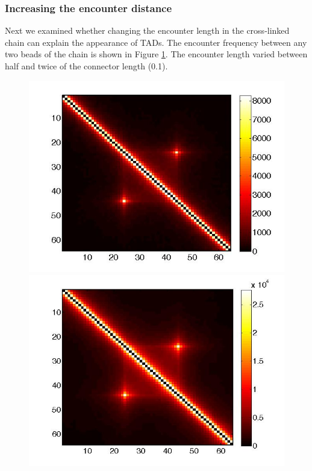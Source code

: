 \documentclass[12pt]{paper}
\begin{document}
\subsubsection{Increasing the encounter distance}
Next we examined whether changing the encounter length in the cross-linked chain can explain the appearance of TADs. The encounter frequency between any two beads of the chain is shown in Figure \ref{encounterFreq64BeadsConnect24And44VaryEncounterLength}. The encounter length varied between half and twice of the connector length (0.1).

\begin{figure}[H]\label{encounterFreq64BeadsConnect24And44VaryEncounterLength}
\includegraphics[scale=0.2]{encounterFrequency64BeadsConnect24And44EncounterDist0_05}
\includegraphics[scale=0.19]{encounterFrequency64BeadsConnect24And44EncounterDist0_1}

\end{figure}
\end{document}
